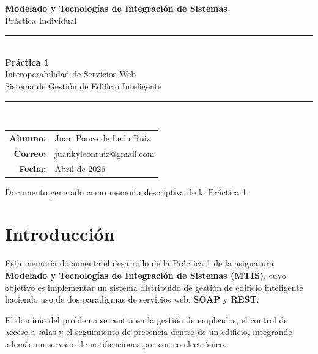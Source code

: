 \documentclass[12pt, a4paper]{article}
\begin{document}

\begin{titlepage}
  \centering
  \vspace*{2cm}

  {\LARGE\bfseries Modelado y Tecnologías de Integración de Sistemas}\\[0.5cm]
  {\large Práctica Individual}\\[2cm]

  \rule{\linewidth}{0.5pt}\\[0.4cm]
  {\huge\bfseries Práctica 1}\\[0.3cm]
  {\Large Interoperabilidad de Servicios Web}\\[0.3cm]
  {\large Sistema de Gestión de Edificio Inteligente}\\
  \rule{\linewidth}{0.5pt}\\[2cm]

  \begin{tabular}{rl}
    \textbf{Alumno:}    & Juan Ponce de León Ruiz \\[0.3cm]
    \textbf{Correo:}    & juankyleonruiz@gmail.com \\[0.3cm]
    \textbf{Fecha:}     & Abril de 2026 \\
  \end{tabular}

  \vfill

  {\small Documento generado como memoria descriptiva de la Práctica 1.}
\end{titlepage}

\tableofcontents
\newpage

\section{Introducción}

Esta memoria documenta el desarrollo de la Práctica 1 de la asignatura \textbf{Modelado y Tecnologías de Integración de Sistemas (MTIS)}, cuyo objetivo es implementar un sistema distribuido de gestión de edificio inteligente haciendo uso de dos paradigmas de servicios web: \textbf{SOAP} y \textbf{REST}.

El dominio del problema se centra en la gestión de empleados, el control de acceso a salas y el seguimiento de presencia dentro de un edificio, integrando además un servicio de notificaciones por correo electrónico.
\end{document}
